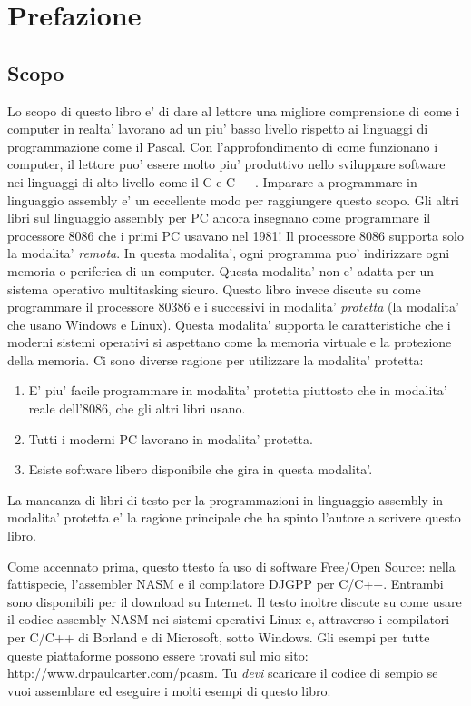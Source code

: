 
\chapter{Prefazione}

\section*{Scopo}

Lo scopo di questo libro e' di dare al lettore una migliore comprensione
di come i computer in realta' lavorano ad un piu' basso livello rispetto
ai linguaggi di programmazione come il Pascal. Con l'approfondimento
di come funzionano i computer, il lettore puo' essere molto piu'
produttivo nello sviluppare software nei linguaggi di alto livello
come il C e C++. Imparare a programmare in linguaggio assembly e' un
eccellente modo per raggiungere questo scopo. Gli altri libri sul
linguaggio assembly per PC ancora insegnano come programmare il processore
8086 che i primi PC usavano nel 1981! Il processore 8086 supporta
solo la modalita' \emph{remota}. In questa modalita', ogni programma
puo' indirizzare ogni memoria o periferica di un computer. Questa
modalita' non e' adatta per un sistema operativo multitasking sicuro.
Questo libro invece discute su come programmare il processore 80386
e i successivi in modalita' \emph{protetta} (la modalita' che usano 
Windows e Linux). Questa modalita' supporta le caratteristiche che 
i moderni sistemi operativi si aspettano come la memoria virtuale e
la protezione della memoria.
Ci sono diverse ragione per utilizzare la modalita' protetta: 
\begin{enumerate}
\item E' piu' facile programmare in modalita' protetta piuttosto che 
			in modalita' reale dell'8086, che gli altri libri usano.
\item Tutti i moderni PC lavorano in modalita' protetta.
\item Esiste software libero disponibile che gira in questa modalita'.
\end{enumerate}
La mancanza di libri di testo per la programmazioni in linguaggio 
assembly in modalita' protetta e' la ragione principale che ha spinto
l'autore a scrivere questo libro.

Come accennato prima, questo ttesto fa uso di software Free/Open Source:
nella fattispecie, l'assembler NASM e il compilatore DJGPP per C/C++.
Entrambi sono disponibili per il download su Internet. Il testo inoltre
discute su come usare il codice assembly NASM nei sistemi operativi Linux
e, attraverso i compilatori per C/C++ di Borland e di Microsoft, sotto 
Windows. Gli esempi per tutte queste piattaforme possono essere trovati
sul mio sito:
{\code http://www.drpaulcarter.com/pcasm}.
Tu \emph{devi} scaricare il codice di sempio se vuoi assemblare ed
eseguire i molti esempi di questo libro.

